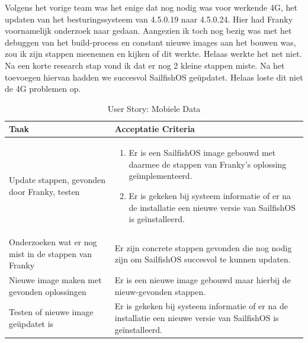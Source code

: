 \documentclass[a4paper]{report}
\newcommand{\userstorycolor}{PeachPuff1}
\begin{document}
  \begin{tcolorbox}[colback=white, coltitle=black, colframe=\userstorycolor, title=\textbf{User Story: }Als gebruiker wil ik graag met de Fairphone mobiele data kunnen gebruiken\, zodat ik ook onderweg internet kan gebruiken.]
    \par\smallskip 
    Volgens het vorige team was het enige dat nog nodig was voor werkende 4G, het updaten van het besturingssysteem van 4.5.0.19 naar 4.5.0.24.
    Hier had Franky voornamelijk onderzoek naar gedaan. Aangezien ik toch nog bezig was met het debuggen van het build-process en constant nieuwe images aan het bouwen was, zou ik zijn stappen meenemen en kijken of dit werkte.
    Helaas werkte het net niet. Na een korte research stap vond ik dat er nog 2 kleine stappen miste. Na het toevoegen hiervan hadden we succesvol SailfishOS geüpdatet.
    Helaas loste dit niet de 4G problemen op.

    \begin{table}[H]
        \centering
      \begin{tabularx}{1\textwidth}{|X|X|}
        \hline
        \cellcolor[HTML]{ffcc99} \textbf{Taak} & \cellcolor[HTML]{ffcc99} \textbf{Acceptatie Criteria} \\ 
        \hline
        Update stappen, gevonden door Franky, testen &
          \begin{enumerate}[leftmargin=.4cm, topsep=0cm, itemsep=.2cm]
          \item Er is een SailfishOS image gebouwd met daarmee de stappen van Franky's oplossing geïmplementeerd.  
          \item Er is gekeken bij systeem informatie of er na de installatie een nieuwe versie van SailfishOS is geïnstalleerd.
          \end{enumerate} \\
        \hline
        Onderzoeken wat er nog mist in de stappen van Franky & Er zijn concrete stappen gevonden die nog nodig zijn om SailfishOS succesvol te kunnen updaten. \\
        \hline 
        Nieuwe image maken met gevonden oplossingen & Er is een nieuwe image gebouwd maar hierbij de nieuw-gevonden stappen. \\ 
        \hline 
        Testen of nieuwe image geüpdatet is & Er is gekeken bij systeem informatie of er na de installatie een nieuwe versie van SailfishOS is geïnstalleerd. \\
        \hline 
        
      \end{tabularx}
      \caption{User Story: Mobiele Data}
    \label{table:it2:story_mobiledata}
    \end{table}
    \end{tcolorbox}
\end{document}

